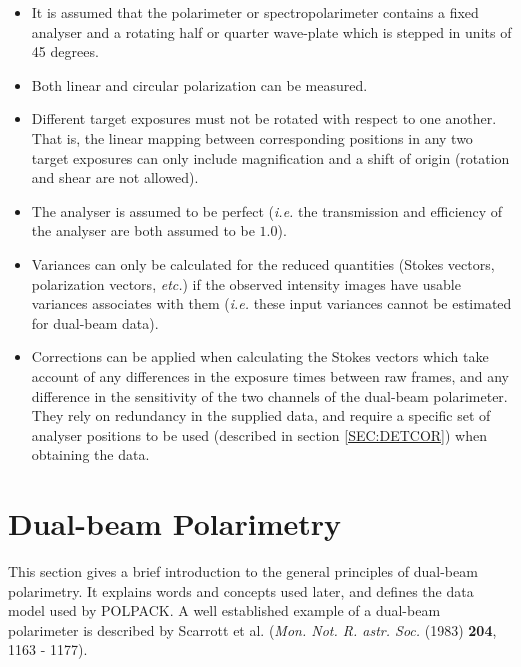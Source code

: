 \documentclass[twoside,11pt]{article}
\newcommand{\hyperref}[4]{#2\ref{#4}#3}
\newcommand{\xlabel}[1]{}
\renewcommand{\_}{\texttt{\symbol{95}}}
\newcommand{\dgs}{\hbox{$^\circ$}}
\renewcommand{\dgs}{ degrees}
\begin{document}
\begin{itemize}

\item It is assumed that the polarimeter or spectropolarimeter contains a 
fixed analyser and a rotating half or quarter wave-plate which is stepped 
in units of 45\dgs. 

\item Both linear and circular polarization can be measured. 

\item Different target exposures must not be rotated with respect to one
another. That is, the linear mapping between corresponding positions in any two target 
exposures can only include magnification and a shift of origin (rotation 
and shear are not allowed).

\item The analyser is assumed to be perfect (\emph{i.e.} the transmission and
efficiency of the analyser are both assumed to be $1.0$).

\item Variances can only be calculated for the reduced quantities (Stokes
vectors, polarization vectors, \emph{etc.}) if the observed intensity
images have usable variances associates with them (\emph{i.e.} these
input variances cannot be estimated for dual-beam data).

\item Corrections can be applied when calculating the Stokes vectors which
take account of any differences in the exposure times between raw frames,
and any difference in the sensitivity of the two channels of the
dual-beam polarimeter. They rely on redundancy in the supplied data, and
require a specific set of analyser positions to be used (described
\hyperref{here}{in section }{} {SEC:DETCOR}) when obtaining the data.

\end{itemize}

\section{\label{SEC:DBPOL}\xlabel{dualbeampolarimetry}Dual-beam Polarimetry}
This section gives a brief introduction to the general principles of
dual-beam polarimetry. It explains words and concepts used later, and
defines the data model used by POLPACK. A well established example of a
dual-beam polarimeter is described by Scarrott et al. (\emph{Mon. Not. R.
astr. Soc.} (1983) \textbf{204}, 1163 - 1177).
\end{document}
